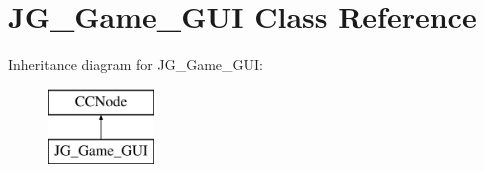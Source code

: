 \hypertarget{class_j_g___game___g_u_i}{\section{J\-G\-\_\-\-Game\-\_\-\-G\-U\-I Class Reference}
\label{class_j_g___game___g_u_i}
}
Inheritance diagram for J\-G\-\_\-\-Game\-\_\-\-G\-U\-I\-:\begin{figure}[H]
\begin{center}
\leavevmode
\includegraphics[height=2.000000cm]{class_j_g___game___g_u_i}
\end{center}
\end{figure}
